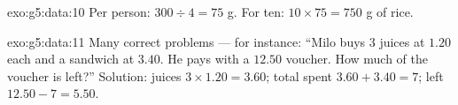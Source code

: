 \begin{solution}{exo:g5:data:10}
Per person: $300 \div 4 = 75$ g. For ten:
$10 \times 75 = 750$ g of rice.
\end{solution}

\begin{solution}{exo:g5:data:11}
Many correct problems --- for instance: ``Milo buys $3$ juices at
$1.20$ each and a sandwich at $3.40$. He pays with a $12.50$
voucher. How much of the voucher is left?'' Solution: juices
$3 \times 1.20 = 3.60$; total spent $3.60 + 3.40 = 7$; left
$12.50 - 7 = 5.50$.
\end{solution}
